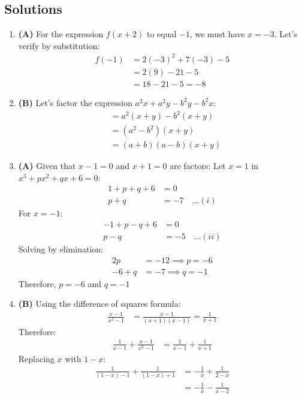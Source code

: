 \subsection{Solutions}
\begin{multicols}{2}
\begin{enumerate}[label={\textbf{\arabic*.}}]
\item \textbf{(A)} For the expression $f(x + 2)$ to equal $-1$, we must have $x = -3$.
    Let's verify by substitution:
    \begin{align*}
    f(-1) &= 2(-3)^2 + 7(-3) - 5 \\
    &= 2(9) - 21 - 5 \\
    &= 18 - 21 - 5 = -8
    \end{align*}

\item \textbf{(B)} Let's factor the expression \(a^2x + a^2y - b^2y - b^2x\):
    \begin{align*}
    &= a^2(x + y) - b^2(x + y) \\
    &= (a^2 - b^2)(x + y) \\
    &= (a + b)(a - b)(x + y)
    \end{align*}

\item \textbf{(A)} Given that $x - 1 = 0$ and $x + 1 = 0$ are factors:
    Let $x = 1$ in $x^3 + px^2 + qx + 6 = 0$:
    \begin{align*}
    1 + p + q + 6 &= 0 \\
    p + q &= -7 \quad ...(i)
    \end{align*}
    For $x = -1$:
    \begin{align*}
    -1 + p - q + 6 &= 0 \\
    p - q &= -5 \quad ...(ii)
    \end{align*}
    Solving by elimination:
    \begin{align*}
    2p &= -12 \implies p = -6 \\
    -6 + q &= -7 \implies q = -1
    \end{align*}
    Therefore, $p = -6$ and $q = -1$

\item \textbf{(B)} Using the difference of squares formula:
    \begin{align*}
    \frac{x - 1}{x^2 - 1} &= \frac{x - 1}{(x+1)(x-1)} = \frac{1}{x + 1}
    \end{align*}
    Therefore:
    \begin{align*}
    \frac{1}{x - 1} + \frac{x - 1}{x^2 - 1} &= \frac{1}{x - 1} + \frac{1}{x + 1}
    \end{align*}
    Replacing $x$ with $1-x$:
    \begin{align*}
    \frac{1}{(1-x) - 1} + \frac{1}{(1-x) + 1} &= -\frac{1}{x} + \frac{1}{2-x} \\
    &= -\frac{1}{x} - \frac{1}{x - 2}
    \end{align*}


\end{enumerate}
\end{multicols}
